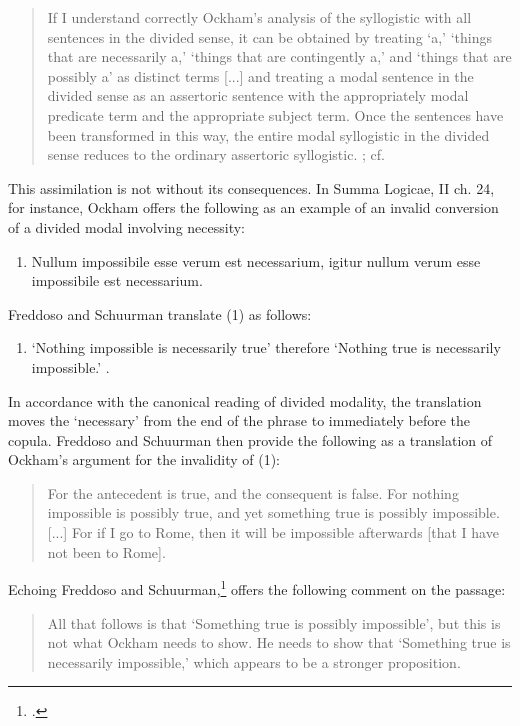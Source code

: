 \documentclass[a4paper]{article}
\begin{document}
\begin{quote}
	If I understand correctly Ockham's analysis of the syllogistic with all sentences in the divided sense, it can be obtained by treating `a,' `things that are necessarily a,' `things that are contingently a,' and `things that are possibly a' as distinct terms [...] and treating a modal sentence in the divided sense as an assertoric sentence with the appropriately modal predicate term and the appropriate subject term. Once the sentences have been transformed in this way, the entire modal syllogistic in the divided sense reduces to the ordinary assertoric syllogistic. \cite[p. 49]{Normore1999}; cf. \cite{DutilhNovaes2004}
\end{quote}

This assimilation is not without its consequences. In Summa Logicae, II ch. 24, for instance, Ockham offers the following as an example of an invalid conversion of a divided modal involving necessity: 
\begin{enumerate} 
\item[(1)] Nullum impossibile esse verum est necessarium, igitur nullum verum esse impossibile est necessarium. \cite[p. 298]{OckhamSL2}
\end{enumerate}

\noindent Freddoso and Schuurman translate (1) as follows:
\begin{enumerate}
	\item[(1')]	`Nothing impossible is necessarily true' therefore `Nothing true is necessarily impossible.' \cite[p. 166]{OckhamSLEng}.
\end{enumerate}

\noindent In accordance with the canonical reading of divided modality, the translation moves the `necessary' from the end of the phrase to immediately before the copula. Freddoso and Schuurman then provide the following as a translation of Ockham's argument for the invalidity of (1):
\begin{quote}
For the antecedent is true, and the consequent is false. For nothing impossible is possibly true, and yet something true is possibly impossible. [...] For if I go to Rome, then it will be impossible afterwards [that I have not been to Rome]. \cite[p. 166]{OckhamSLEng}
\end{quote}

Echoing Freddoso and Schuurman,\footnote{\cite[p. 203, fn. 4]{OckhamSLEng}.} \cite{Johnston2015} offers the following comment on the passage: 

\begin{quote}
All that follows is that `Something true is possibly impossible', but this is not what Ockham needs to show. He needs to show that `Something true is necessarily impossible,' which appears to be a stronger proposition.  \cite[p. 243]{Johnston2015}
\end{quote}
\end{document}
